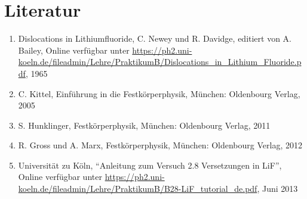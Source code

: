 \documentclass[12pt,a4paper]{scrartcl}
\numberwithin{equation}{section} %
\renewcommand{\[}{} %
\renewcommand{\]}{\noindent} %
\newcommand{\tightlist}{} %
\begin{document}
\hypertarget{literatur}{%
\section{Literatur}\label{literatur}}

\begin{enumerate}
\def\labelenumi{\arabic{enumi}.}
\tightlist
\item
  Dislocations in Lithiumfluoride, C. Newey und R. Davidge, editiert von
  A. Bailey, Online verfügbar unter
  \url{https://ph2.uni-koeln.de/fileadmin/Lehre/PraktikumB/Dislocations_in_Lithium_Fluoride.pdf},
  1965
\item
  C. Kittel, Einführung in die Festkörperphysik, München: Oldenbourg
  Verlag, 2005
\item
  S. Hunklinger, Festkörperphysik, München: Oldenbourg Verlag, 2011
\item
  R. Gross und A. Marx, Festkörperphysik, München: Oldenbourg Verlag,
  2012
\item
  Universität zu Köln, ``Anleitung zum Versuch 2.8 Versetzungen in
  LiF'', Online verfügbar unter
  \url{https://ph2.uni-koeln.de/fileadmin/Lehre/PraktikumB/B28-LiF_tutorial_de.pdf},
  Juni 2013
\end{enumerate}
\end{document}
